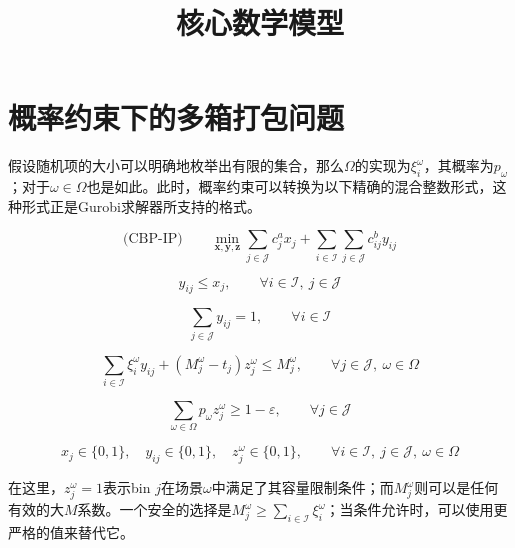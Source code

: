 \documentclass{article}
\title{核心数学模型}
\date{}
\begin{document}
\maketitle

\section*{概率约束下的多箱打包问题}

假设随机项的大小可以明确地枚举出有限的集合，那么$\Omega$的实现为$\xi_i^\omega$，其概率为$p_\omega$；对于$\omega \in \Omega$也是如此。此时，概率约束可以转换为以下精确的混合整数形式，这种形式正是Gurobi求解器所支持的格式。

\begin{equation}
\text{(CBP-IP)} \qquad \min_{\boldsymbol{x}, \boldsymbol{y}, \boldsymbol{z}}
\sum_{j \in \mathcal{J}} c_j^a x_j
+ \sum_{i \in \mathcal{I}} \sum_{j \in \mathcal{J}} c_{ij}^b y_{ij}
\tag{1a}
\end{equation}

\begin{equation}
y_{ij} \le x_j,
\qquad \forall i \in \mathcal{I},\ j \in \mathcal{J}
\tag{1b}
\end{equation}

\begin{equation}
\sum_{j \in \mathcal{J}} y_{ij} = 1,
\qquad \forall i \in \mathcal{I}
\tag{1c}
\end{equation}

\begin{equation}
\sum_{i \in \mathcal{I}} \xi_i^\omega y_{ij}
+ \left(M_j^\omega - t_j\right) z_j^\omega
\le M_j^\omega,
\qquad \forall j \in \mathcal{J},\ \omega \in \Omega
\tag{1d}
\end{equation}

\begin{equation}
\sum_{\omega \in \Omega} p_\omega z_j^\omega \ge 1 - \varepsilon,
\qquad \forall j \in \mathcal{J}
\tag{1e}
\end{equation}

\begin{equation}
x_j \in \{0,1\}, \quad y_{ij} \in \{0,1\}, \quad z_j^\omega \in \{0,1\},
\qquad \forall i \in \mathcal{I},\ j \in \mathcal{J},\ \omega \in \Omega
\tag{1f}
\end{equation}

在这里，$z_j^\omega = 1$表示bin $j$在场景$\omega$中满足了其容量限制条件；而$M_j^\omega$则可以是任何有效的大$M$系数。一个安全的选择是$M_j^\omega \ge \sum_{i \in \mathcal{I}} \xi_i^\omega$；当条件允许时，可以使用更严格的值来替代它。
\end{document}
